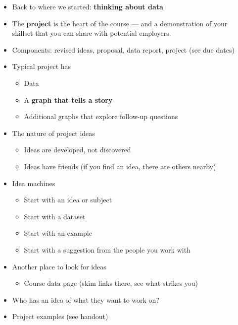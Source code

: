 \documentclass[11pt]{article}
\begin{document}
\begin{itemize}
\item Back to where we started:  {\bf thinking about data}

\item The {\bf project} is the heart of the course --- and a demonstration of your skillset
that you can share with potential employers.

\item Components:  revised ideas, proposal, data report, project (see due dates)

\item Typical project has
\begin{itemize}
\item Data
\item A {\bf graph that tells a story\/}
\item Additional graphs that explore follow-up questions
\end{itemize}


\item The nature of project ideas
\begin{itemize}
\item Ideas are developed, not discovered
\item Ideas have friends (if you find an idea, there are others nearby)
\end{itemize}


\item Idea machines
\begin{itemize}
\item Start with an idea or subject
\item Start with a dataset
\item Start with an example
\item Start with a suggestion from the people you work with
\end{itemize}



\item Another place to look for ideas
\begin{itemize}
\item Course data page (skim links there, see what strikes you)
\end{itemize}

\item Who has an idea of what they want to work on?

\item Project examples (see handout)
\end{itemize}
\end{document}
